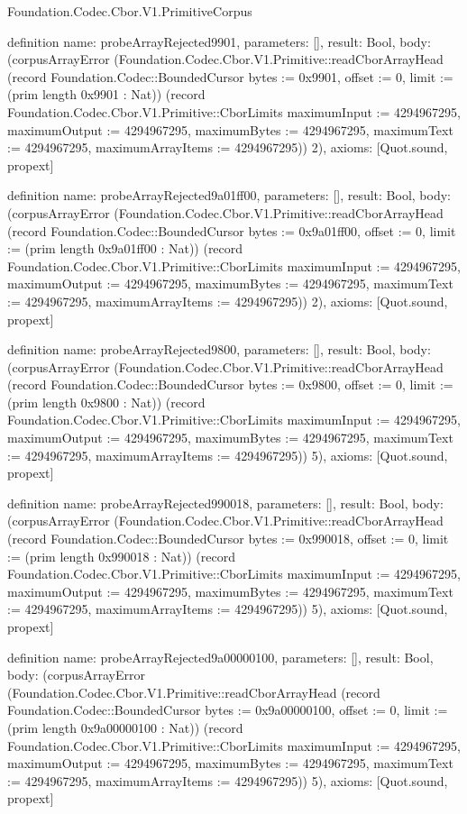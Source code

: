 \begin{lexlean}{Foundation.Codec.Cbor.V1.PrimitiveCorpus}
\begin{semanticmodule}
definition{
  name: probeArrayRejected9901,
  parameters: [],
  result: Bool,
  body: (corpusArrayError (Foundation.Codec.Cbor.V1.Primitive::readCborArrayHead (record Foundation.Codec::BoundedCursor {bytes := 0x9901, offset := 0, limit := (prim length 0x9901 : Nat)}) (record Foundation.Codec.Cbor.V1.Primitive::CborLimits {maximumInput := 4294967295, maximumOutput := 4294967295, maximumBytes := 4294967295, maximumText := 4294967295, maximumArrayItems := 4294967295})) 2),
  axioms: [Quot.sound, propext]
}

definition{
  name: probeArrayRejected9a01ff00,
  parameters: [],
  result: Bool,
  body: (corpusArrayError (Foundation.Codec.Cbor.V1.Primitive::readCborArrayHead (record Foundation.Codec::BoundedCursor {bytes := 0x9a01ff00, offset := 0, limit := (prim length 0x9a01ff00 : Nat)}) (record Foundation.Codec.Cbor.V1.Primitive::CborLimits {maximumInput := 4294967295, maximumOutput := 4294967295, maximumBytes := 4294967295, maximumText := 4294967295, maximumArrayItems := 4294967295})) 2),
  axioms: [Quot.sound, propext]
}

definition{
  name: probeArrayRejected9800,
  parameters: [],
  result: Bool,
  body: (corpusArrayError (Foundation.Codec.Cbor.V1.Primitive::readCborArrayHead (record Foundation.Codec::BoundedCursor {bytes := 0x9800, offset := 0, limit := (prim length 0x9800 : Nat)}) (record Foundation.Codec.Cbor.V1.Primitive::CborLimits {maximumInput := 4294967295, maximumOutput := 4294967295, maximumBytes := 4294967295, maximumText := 4294967295, maximumArrayItems := 4294967295})) 5),
  axioms: [Quot.sound, propext]
}

definition{
  name: probeArrayRejected990018,
  parameters: [],
  result: Bool,
  body: (corpusArrayError (Foundation.Codec.Cbor.V1.Primitive::readCborArrayHead (record Foundation.Codec::BoundedCursor {bytes := 0x990018, offset := 0, limit := (prim length 0x990018 : Nat)}) (record Foundation.Codec.Cbor.V1.Primitive::CborLimits {maximumInput := 4294967295, maximumOutput := 4294967295, maximumBytes := 4294967295, maximumText := 4294967295, maximumArrayItems := 4294967295})) 5),
  axioms: [Quot.sound, propext]
}

definition{
  name: probeArrayRejected9a00000100,
  parameters: [],
  result: Bool,
  body: (corpusArrayError (Foundation.Codec.Cbor.V1.Primitive::readCborArrayHead (record Foundation.Codec::BoundedCursor {bytes := 0x9a00000100, offset := 0, limit := (prim length 0x9a00000100 : Nat)}) (record Foundation.Codec.Cbor.V1.Primitive::CborLimits {maximumInput := 4294967295, maximumOutput := 4294967295, maximumBytes := 4294967295, maximumText := 4294967295, maximumArrayItems := 4294967295})) 5),
  axioms: [Quot.sound, propext]
}


\end{semanticmodule}
\end{lexlean}
